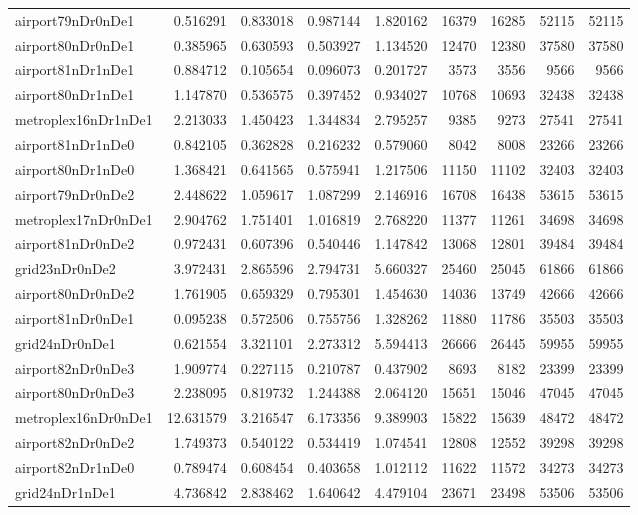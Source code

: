 \begin{longtable}{|l|r|r|r|r|r|r|r|r|}
airport79nDr0nDe1 & 0.516291 & 0.833018 & 0.987144 & 1.820162 & 16379 & 16285 & 52115 & 52115 \\
airport80nDr0nDe1 & 0.385965 & 0.630593 & 0.503927 & 1.134520 & 12470 & 12380 & 37580 & 37580 \\
airport81nDr1nDe1 & 0.884712 & 0.105654 & 0.096073 & 0.201727 & 3573 & 3556 & 9566 & 9566 \\
airport80nDr1nDe1 & 1.147870 & 0.536575 & 0.397452 & 0.934027 & 10768 & 10693 & 32438 & 32438 \\
metroplex16nDr1nDe1 & 2.213033 & 1.450423 & 1.344834 & 2.795257 & 9385 & 9273 & 27541 & 27541 \\
airport81nDr1nDe0 & 0.842105 & 0.362828 & 0.216232 & 0.579060 & 8042 & 8008 & 23266 & 23266 \\
airport80nDr1nDe0 & 1.368421 & 0.641565 & 0.575941 & 1.217506 & 11150 & 11102 & 32403 & 32403 \\
airport79nDr0nDe2 & 2.448622 & 1.059617 & 1.087299 & 2.146916 & 16708 & 16438 & 53615 & 53615 \\
metroplex17nDr0nDe1 & 2.904762 & 1.751401 & 1.016819 & 2.768220 & 11377 & 11261 & 34698 & 34698 \\
airport81nDr0nDe2 & 0.972431 & 0.607396 & 0.540446 & 1.147842 & 13068 & 12801 & 39484 & 39484 \\
grid23nDr0nDe2 & 3.972431 & 2.865596 & 2.794731 & 5.660327 & 25460 & 25045 & 61866 & 61866 \\
airport80nDr0nDe2 & 1.761905 & 0.659329 & 0.795301 & 1.454630 & 14036 & 13749 & 42666 & 42666 \\
airport81nDr0nDe1 & 0.095238 & 0.572506 & 0.755756 & 1.328262 & 11880 & 11786 & 35503 & 35503 \\
grid24nDr0nDe1 & 0.621554 & 3.321101 & 2.273312 & 5.594413 & 26666 & 26445 & 59955 & 59955 \\
airport82nDr0nDe3 & 1.909774 & 0.227115 & 0.210787 & 0.437902 & 8693 & 8182 & 23399 & 23399 \\
airport80nDr0nDe3 & 2.238095 & 0.819732 & 1.244388 & 2.064120 & 15651 & 15046 & 47045 & 47045 \\
metroplex16nDr0nDe1 & 12.631579 & 3.216547 & 6.173356 & 9.389903 & 15822 & 15639 & 48472 & 48472 \\
airport82nDr0nDe2 & 1.749373 & 0.540122 & 0.534419 & 1.074541 & 12808 & 12552 & 39298 & 39298 \\
airport82nDr1nDe0 & 0.789474 & 0.608454 & 0.403658 & 1.012112 & 11622 & 11572 & 34273 & 34273 \\
grid24nDr1nDe1 & 4.736842 & 2.838462 & 1.640642 & 4.479104 & 23671 & 23498 & 53506 & 53506 \\

\end{longtable}
